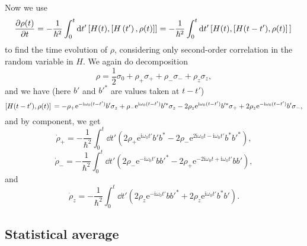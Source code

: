 \documentclass[hyperref, a4paper]{article}
\newcommand*{\ii}{\mathrm{i}}
\newcommand*{\ee}{\mathrm{e}}
\begin{document}
Now we use 
\begin{equation}
    \frac{\partial \rho(t)}{\partial t}=-\frac{1}{\hbar^2} \int_0^t \dd t^{\prime}\left[H(t),\left[H\left(t^{\prime}\right), \rho(t)\right]\right] 
    = - \frac{1}{\hbar^2} \int_{0}^t \dd{t'} \comm*{H(t)}{\comm*{H(t - t')}{\rho(t)}}
\end{equation}
to find the time evolution of $\rho$, 
considering only second-order correlation 
in the random variable in $H$.
We again do decomposition
\begin{equation}
    \rho = \frac{1}{2} \sigma_0 + \rho_+ \sigma_+ + \rho_- \sigma_- + \rho_z \sigma_z,
\end{equation}
and we have (here $b'$ and $b'^*$ are values taken at $t - t'$)
\[
    \comm*{H(t - t')}{\rho(t)}
    = - \rho_+ \ee^{- \ii \omega_0 (t - t')} b' \sigma_z 
    + \rho_- \ee^{\ii \omega_0 (t - t')} b'^* \sigma_z 
    - 2 \rho_z \ee^{\ii \omega_0 (t - t')} b'^* \sigma_+ 
    + 2 \rho_z \ee^{- \ii \omega_0 (t - t')} b' \sigma_-,
\]
and by component, we get 
\begin{equation}
    \dot{\rho}_{+} = - \frac{1}{\hbar^2} \int_{0}^{t} \dd{t'} \left(
        2 \rho_+ \ee^{\ii \omega_0 t'} b' b^* 
        - 2 \rho_- \ee^{2 \ii \omega_0 t - \ii \omega_0 t'} b^* b'^*
    \right),
\end{equation}
\begin{equation}
    \dot{\rho}_{-} = - \frac{1}{\hbar^2} \int_{0}^{t} \dd{t'} \left(
        2 \rho_- \ee^{- \ii \omega_0 t'} b b'^* 
        - 2 \rho_+ \ee^{- 2 \ii \omega_0 t + \ii \omega_0 t'} b b'
    \right),
\end{equation}
and 
\begin{equation}
    \dot{\rho}_z = - \frac{1}{\hbar^2} \int_{0}^{t} \dd{t'} \left(
        2 \rho_z \ee^{- \ii \omega_0 t'} b b'^* 
        + 2 \rho_z \ee^{\ii \omega_0 t'} b^* b'
    \right).
\end{equation}

\subsection{Statistical average}
\end{document}
